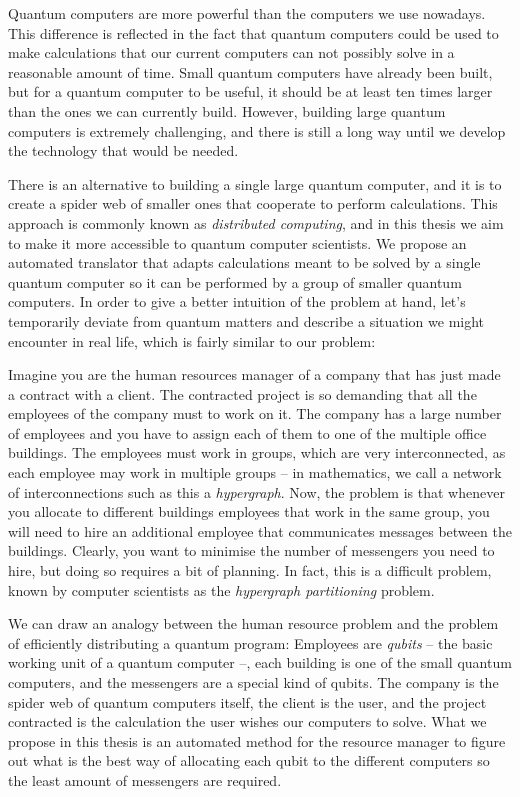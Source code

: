 Quantum computers are more powerful than the computers we use nowadays. This difference is reflected in the fact that quantum computers could be used to make calculations that our current computers can not possibly solve in a reasonable amount of time. Small quantum computers have already been built, but for a quantum computer to be useful, it should be at least ten times larger than the ones we can currently build. However, building large quantum computers is extremely challenging, and there is still a long way until we develop the technology that would be needed.

There is an alternative to building a single large quantum computer, and it is to create a spider web of smaller ones that cooperate to perform calculations. This approach is commonly known as \textit{distributed computing}, and in this thesis we aim to make it more accessible to quantum computer scientists. We propose an automated translator that adapts calculations meant to be solved by a single quantum computer so it can be performed by a group of smaller quantum computers. In order to give a better intuition of the problem at hand, let's temporarily deviate from quantum matters and describe a situation we might encounter in real life, which is fairly similar to our problem: 

Imagine you are the human resources manager of a company that has just made a contract with a client. The contracted project is so demanding that all the employees of the company must to work on it. The company has a large number of employees and you have to assign each of them to one of the multiple office buildings. The employees must work in groups, which are very interconnected, as each employee may work in multiple groups -- in mathematics, we call a network of interconnections such as this a \textit{hypergraph}. Now, the problem is that whenever you allocate to different buildings employees that work in the same group, you will need to hire an additional employee that communicates messages between the buildings. Clearly, you want to minimise the number of messengers you need to hire, but doing so requires a bit of planning. In fact, this is a difficult problem, known by computer scientists as the \textit{hypergraph partitioning} problem.

We can draw an analogy between the human resource problem and the problem of efficiently distributing a quantum program: Employees are \textit{qubits} -- the basic working unit of a quantum computer --, each building is one of the small quantum computers, and the messengers are a special kind of qubits. The company is the spider web of quantum computers itself, the client is the user, and the project contracted is the calculation the user wishes our computers to solve. What we propose in this thesis is an automated method for the resource manager to figure out what is the best way of allocating each qubit to the different computers so the least amount of messengers are required.

